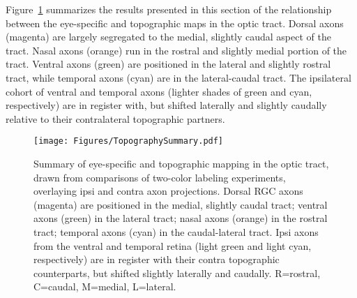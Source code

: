 Figure~\ref{Figures/TopographySummary} summarizes the results presented in this section of the relationship between the eye-specific and topographic maps in the optic tract.
Dorsal axons (magenta) are largely segregated to the medial, slightly caudal aspect of the tract.
Nasal axons (orange) run in the rostral and slightly medial portion of the tract.
Ventral axons (green) are positioned in the lateral and slightly rostral tract, while temporal axons (cyan) are in the lateral-caudal tract.
The ipsilateral cohort of ventral and temporal axons (lighter shades of green and cyan, respectively) are in register with, but shifted laterally and slightly caudally relative to their contralateral topographic partners.
\begin{figure}[hbtp]
    \begin{center}
        \texttt{[image: Figures/TopographySummary.pdf]}
        \caption[Summary of eye-specific and topographic mapping in the optic tract.]
        {Summary of eye-specific and topographic mapping in the optic tract, drawn from comparisons of two-color labeling experiments, overlaying ipsi and contra axon projections.
        Dorsal RGC axons (magenta) are positioned in the medial, slightly caudal tract; ventral axons (green) in the lateral tract; nasal axons (orange) in the rostral tract; temporal axons (cyan) in the caudal-lateral tract.
        Ipsi axons from the ventral and temporal retina (light green and light cyan, respectively) are in register with their contra topographic counterparts, but shifted slightly laterally and caudally.
        R=rostral, C=caudal, M=medial, L=lateral.}
        \label{Figures/TopographySummary}
    \end{center}
\end{figure}